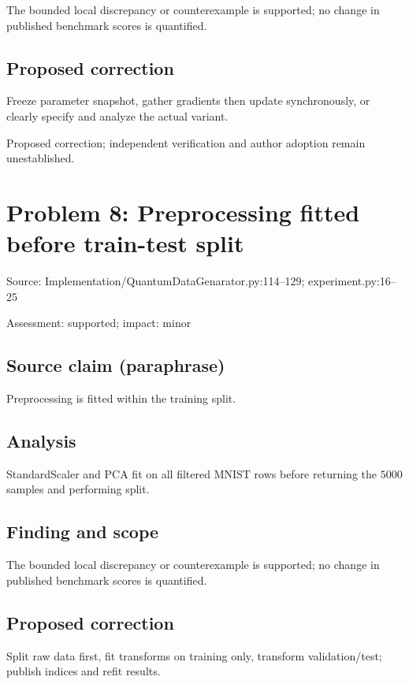\documentclass[11pt]{article}
\begin{document}
The bounded local discrepancy or counterexample is supported; no change in published benchmark scores is quantified.

\subsection*{Proposed correction}

Freeze parameter snapshot, gather gradients then update synchronously, or clearly specify and analyze the actual variant.

Proposed correction; independent verification and author adoption remain unestablished.

\section*{Problem 8: Preprocessing fitted before train-test split}

Source: Implementation/QuantumDataGenarator.py:114–129; experiment.py:16–25

Assessment: supported; impact: minor

\subsection*{Source claim (paraphrase)}

Preprocessing is fitted within the training split.

\subsection*{Analysis}

StandardScaler and PCA fit on all filtered MNIST rows before returning the \(5000\) samples and performing split.

\subsection*{Finding and scope}

The bounded local discrepancy or counterexample is supported; no change in published benchmark scores is quantified.

\subsection*{Proposed correction}

Split raw data first, fit transforms on training only, transform validation/test; publish indices and refit results.
\end{document}
